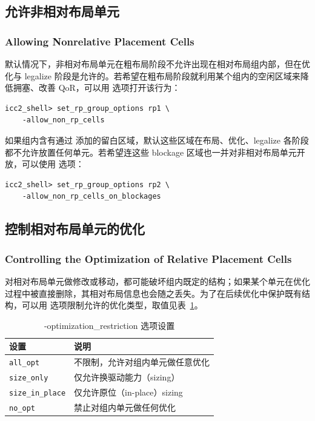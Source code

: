 \subsection{允许非相对布局单元}
\subsubsection*{Allowing Nonrelative Placement Cells}

默认情况下，非相对布局单元在粗布局阶段不允许出现在相对布局组内部，但在优化与 legalize 阶段是允许的。若希望在粗布局阶段就利用某个组内的空闲区域来降低拥塞、改善 QoR，可以用  选项打开该行为：
\begin{lstlisting}
icc2_shell> set_rp_group_options rp1 \
    -allow_non_rp_cells
\end{lstlisting}

如果组内含有通过  添加的留白区域，默认这些区域在布局、优化、legalize 各阶段都不允许放置任何单元。若希望连这些 blockage 区域也一并对非相对布局单元开放，可以使用  选项：
\begin{lstlisting}
icc2_shell> set_rp_group_options rp2 \
    -allow_non_rp_cells_on_blockages
\end{lstlisting}

\subsection{控制相对布局单元的优化}
\subsubsection*{Controlling the Optimization of Relative Placement Cells}

对相对布局单元做修改或移动，都可能破坏组内既定的结构；如果某个单元在优化过程中被直接删除，其相对布局信息也会随之丢失。为了在后续优化中保护既有结构，可以用  选项限制允许的优化类型，取值见表~\ref{tab:rp-opt-restrict}。

\begin{table}[htbp]
\centering
\caption{-optimization\_restriction 选项设置}
\label{tab:rp-opt-restrict}
\begin{tabularx}{\textwidth}{lX}
\toprule
设置 & 说明 \\
\midrule
\texttt{all\_opt} & 不限制，允许对组内单元做任意优化 \\
\texttt{size\_only} & 仅允许换驱动能力（sizing） \\
\texttt{size\_in\_place} & 仅允许原位（in-place）sizing \\
\texttt{no\_opt} & 禁止对组内单元做任何优化 \\
\bottomrule
\end{tabularx}
\end{table}

